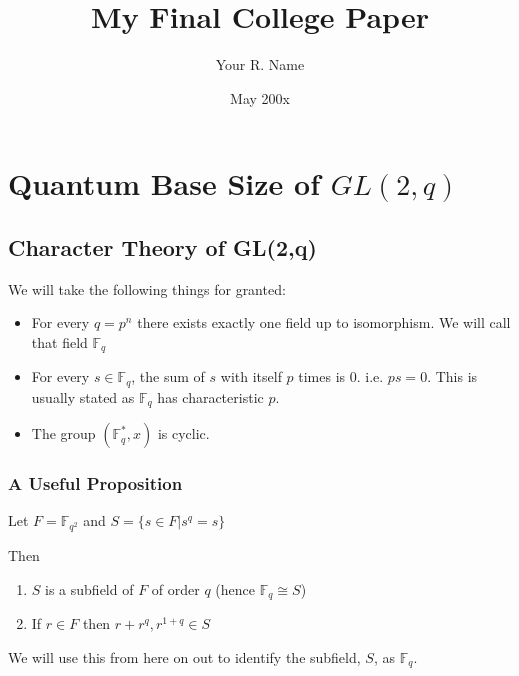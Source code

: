 \documentclass[12pt,twoside]{reedthesis}
\title{My Final College Paper}
\author{Your R. Name}
\date{May 200x}
\begin{document}
\chapter{Quantum Base Size of $GL(2,q)$}


\section*{Character Theory of GL(2,q)}


We will take the following things for granted:

\begin{itemize}
\item For every $q=p^n$ there exists exactly one field up to isomorphism.  We will call that field $\mathbb{F}_q$


\item For every $s\in\mathbb{F}_q$, the sum of $s$ with itself $p$ times is 0.  i.e. $ps=0$.  This is usually stated as  $\mathbb{F}_q$ has characteristic $p$.

\item The group $(\mathbb{F}^*_q,x)$ is cyclic.


\end{itemize}



\subsection*{A Useful Proposition}

Let $F= \mathbb{F}_{q^2}$ 
and 
$S=\{ s \in F | s^q = s \}$

Then

\begin{enumerate}
    \item $S$ is a subfield of $F$ of order $q$ (hence $\mathbb{F}_q \cong S$)
    \item If $r\in{F}$ then $r+r^q, r^{1+q}\in{S}$
\end{enumerate} 

We will use this from here on out to identify the subfield, $S$, as $\mathbb{F}_q$.
\end{document}
